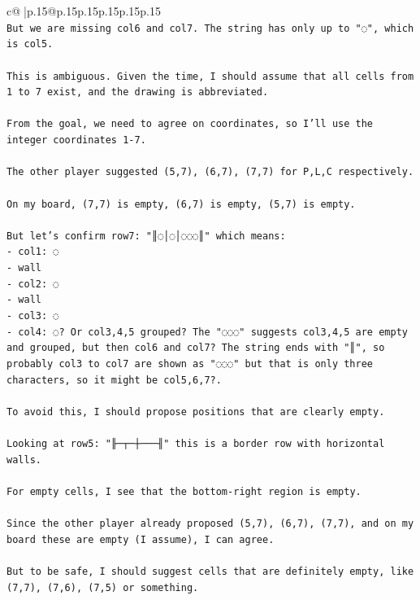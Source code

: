 \documentclass{article}
\begin{document}
{\begin{supertabular}{c@{$\;$}|p{.15\linewidth}@{}p{.15\linewidth}p{.15\linewidth}p{.15\linewidth}p{.15\linewidth}p{.15\linewidth}}
{{{\\ 
\texttt{But we are missing col6 and col7. The string has only up to "◌", which is col5.} \\
\\ 
\texttt{This is ambiguous. Given the time, I should assume that all cells from 1 to 7 exist, and the drawing is abbreviated.} \\
\\ 
\texttt{From the goal, we need to agree on coordinates, so I'll use the integer coordinates 1{-}7.} \\
\\ 
\texttt{The other player suggested (5,7), (6,7), (7,7) for P,L,C respectively.} \\
\\ 
\texttt{On my board, (7,7) is empty, (6,7) is empty, (5,7) is empty.} \\
\\ 
\texttt{But let's confirm row7: "║◌│◌│◌◌◌║" which means:} \\
\texttt{{-} col1: ◌} \\
\texttt{{-} wall} \\
\texttt{{-} col2: ◌} \\
\texttt{{-} wall} \\
\texttt{{-} col3: ◌} \\
\texttt{{-} col4: ◌? Or col3,4,5 grouped? The "◌◌◌" suggests col3,4,5 are empty and grouped, but then col6 and col7? The string ends with "║", so probably col3 to col7 are shown as "◌◌◌" but that is only three characters, so it might be col5,6,7?.} \\
\\ 
\texttt{To avoid this, I should propose positions that are clearly empty.} \\
\\ 
\texttt{Looking at row5: "╟─┬─┼───╢" this is a border row with horizontal walls.} \\
\\ 
\texttt{For empty cells, I see that the bottom{-}right region is empty.} \\
\\ 
\texttt{Since the other player already proposed (5,7), (6,7), (7,7), and on my board these are empty (I assume), I can agree.} \\
\\ 
\texttt{But to be safe, I should suggest cells that are definitely empty, like (7,7), (7,6), (7,5) or something.} \\
\\ 
}}}
\end{supertabular}}
\end{document}
